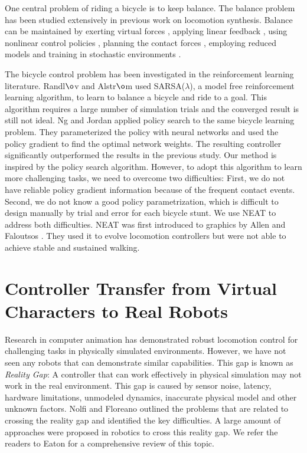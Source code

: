 One central problem of riding a bicycle is to keep balance. The balance problem has been studied extensively in previous work on locomotion synthesis. Balance can be maintained by exerting virtual forces \cite{Pratt2001,Coros2010}, applying linear feedback \cite{Laszlo:1996,Yin:2007,daSilva:2008,Coros2010}, using nonlinear control policies \cite{Muico:2009}, planning the contact forces \cite{Muico:2009,Tan:2012}, employing reduced models \cite{Tsai:2010,Kwon:2010,Mordatch:2010:RPL,Coros2010,Ye:2010} and training in stochastic environments \cite{Wang:2010}.

The bicycle control problem has been investigated in the reinforcement learning literature. Randl$\o$v and Alstr$\o$m \cite{RandlovAlstrom:1998} used SARSA($\lambda$), a model free reinforcement learning algorithm, to learn to balance a bicycle and ride to a goal. This algorithm requires a large number of simulation trials and the converged result is still not ideal. Ng and Jordan \cite{Ng:2000:PPS} applied policy search to the same bicycle learning problem. They parameterized the policy with neural networks and used the policy gradient to find the optimal network weights. The resulting controller significantly outperformed the results in the previous study. Our method is inspired by the policy search algorithm. However, to adopt this algorithm to learn more challenging tasks, we need to overcome two difficulties: First, we do not have reliable policy gradient information because of the frequent contact events. Second, we do not know a good policy parametrization, which is difficult to design manually by trial and error for each bicycle stunt. We use NEAT \cite{Stanley:2002:ENN} to address both difficulties. NEAT was first introduced to graphics by Allen and Faloutsos \cite{Allen2009}. They used it to evolve locomotion controllers but were not able to achieve stable and sustained walking.

\section{Controller Transfer from Virtual Characters to Real Robots}
Research in computer animation has demonstrated robust locomotion control for challenging tasks in physically simulated environments. However, we have not seen any robots that can demonstrate similar capabilities. This gap is known as \emph{Reality Gap}: A controller that can work effectively in physical simulation may not work in the real environment. This gap is caused by sensor noise, latency, hardware limitations, unmodeled dynamics, inaccurate physical model and other unknown factors. Nolfi and Floreano \cite{Nolfi:2000} outlined the problems that are related to crossing the reality gap and identified the key difficulties. A large amount of approaches were proposed in robotics to cross this reality gap. We refer the readers to Eaton \cite{Eaton:2015} for a comprehensive review of this topic.

